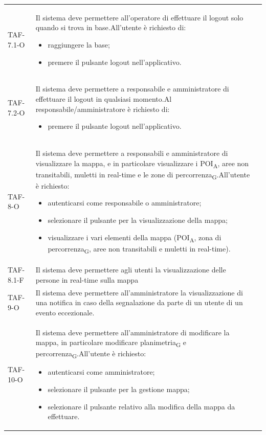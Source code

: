 \begin{longtable}{ >{\centering}p{} >{}p{}
		>{\centering}p{}}
	TAF-7.1-O & Il sistema deve permettere all'operatore di effettuare il logout solo quando si trova in base.\newline All'utente è richiesto di: \begin{itemize} \item raggiungere la base; \item premere il pulsante logout nell'applicativo. \end{itemize} & 0\tabularnewline

	TAF-7.2-O & Il sistema deve permettere a responsabile e amministratore di effettuare il logout in qualsiasi momento.\newline Al responsabile/amministratore è richiesto di: \begin{itemize} \item premere il pulsante logout nell'applicativo. \end{itemize} & 0\tabularnewline

	TAF-8-O & Il sistema deve permettere a responsabili e amministratore di visualizzare la mappa, e in particolare visualizzare i \acrshort{POI}\textsubscript{A}, aree non transitabili, muletti in real-time e le zone di \gls{percorrenza}\textsubscript{G}.\newline All'utente è richiesto:\begin{itemize} \item autenticarsi come responsabile o amministratore; \item selezionare il pulsante per la visualizzazione della mappa; \item visualizzare i vari elementi della mappa (\acrshort{POI}\textsubscript{A}, zona di \gls{percorrenza}\textsubscript{G}, aree non transitabili e muletti in real-time). \end{itemize} & 0\tabularnewline

	TAF-8.1-F & Il sistema deve permettere agli utenti la visualizzazione delle persone in real-time sulla mappa & 0\tabularnewline

	TAF-9-O & Il sistema deve permettere all'amministratore la visualizzazione di una notifica in caso della segnalazione da parte di un utente di un evento eccezionale. & 0\tabularnewline

	TAF-10-O & Il sistema deve permettere all'amministratore di modificare la mappa, in particolare modificare \gls{planimetria}\textsubscript{G} e \gls{percorrenza}\textsubscript{G}.\newline All'utente è richiesto: \begin{itemize} \item autenticarsi come amministratore; \item selezionare il pulsante per la gestione mappa; \item selezionare il pulsante relativo alla modifica della mappa da effettuare.\end{itemize} & 0\tabularnewline


\end{longtable}
